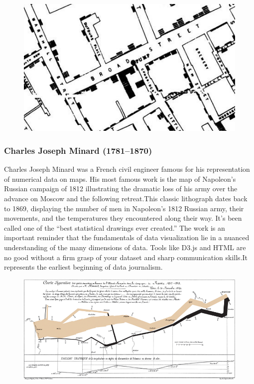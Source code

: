 \documentclass[]{book}
\theoremstyle{definition}
\theoremstyle{definition}
\theoremstyle{definition}
\theoremstyle{remark}
\begin{document}
\begin{figure}
\centering
\includegraphics{images/Snow.png}
\caption{}
\end{figure}

\subsubsection{Charles Joseph Minard
(1781--1870)}\label{charles-joseph-minard-17811870}

Charles Joseph Minard was a French civil engineer famous for his
representation of numerical data on maps. His most famous work is the
map of Napoleon's Russian campaign of 1812 illustrating the dramatic
loss of his army over the advance on Moscow and the following
retreat.This classic lithograph dates back to 1869, displaying the
number of men in Napoleon's 1812 Russian army, their movements, and the
temperatures they encountered along their way. It's been called one of
the ``best statistical drawings ever created.'' The work is an important
reminder that the fundamentals of data visualization lie in a nuanced
understanding of the many dimensions of data. Tools like D3.js and HTML
are no good without a firm grasp of your dataset and sharp communication
skills.It represents the earliest beginning of data journalism.

\begin{figure}
\centering
\includegraphics{images/Minard.png}
\caption{}
\end{figure}
\end{document}
